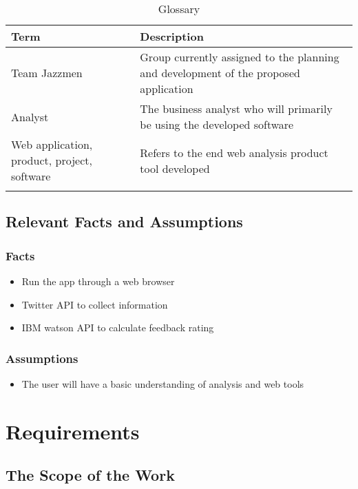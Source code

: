 \documentclass[12pt]{article}
\begin{document}
\begin{table}[h]
\centering
\caption{Glossary}
\begin{tabularx}{\textwidth}{|l|X|}
\Xhline{2\arrayrulewidth}
\bf Term & \bf Description\\
\hline
Team Jazzmen & Group currently assigned to the planning and development of the proposed application\\\hline
Analyst & The business analyst who will primarily be using the developed software\\\hline
Web application, product, project, software & Refers to the end web analysis product tool developed\\
\Xhline{2\arrayrulewidth}
\end{tabularx}
\end{table}

\subsection{Relevant Facts and Assumptions} %
\subsubsection{Facts}
\begin{itemize}
\item Run the app through a web browser
\item Twitter API to collect information
\item IBM watson API to calculate feedback rating
\end{itemize}

\subsubsection{Assumptions}
\begin{itemize}
\item The user will have a basic understanding of analysis and web tools
\end{itemize}

\newpage
\section{Requirements}

\subsection{The Scope of the Work} %
\end{document}
